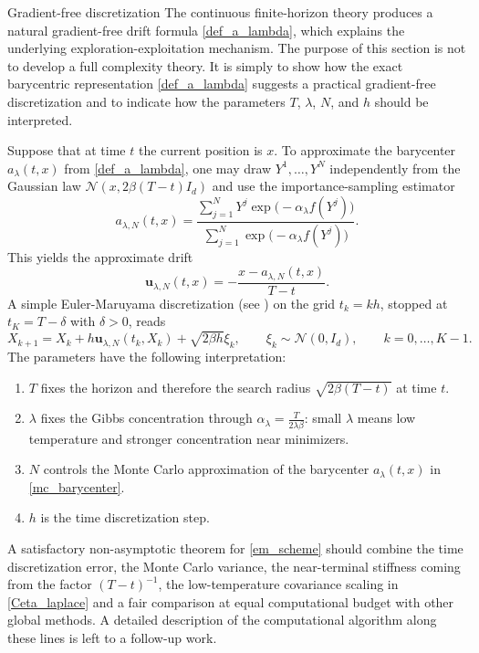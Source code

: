 \documentclass[11pt]{amsart}
\makeatletter
\renewcommand{\section}{\@startsection{section}{1}%
 \z@{.7\linespacing\@plus\linespacing}{.5\linespacing}%
 {\normalfont\large\bfseries\centering}} %
\numberwithin{equation}{section}
\numberwithin{figure}{section}
\theoremstyle{definition}\newtheorem{remark}[theorem]{Remark}%
\makeatother
\begin{document}
\section{Gradient-free discretization}\label{numerics_sec}
The continuous finite-horizon theory produces a natural gradient-free drift formula \eqref{def_a_lambda}, which explains the underlying exploration-exploitation mechanism. The purpose of this section is not to develop a full complexity theory. It is simply to show how the exact barycentric representation \eqref{def_a_lambda} suggests a practical gradient-free discretization and to indicate how the parameters $T$, $\lambda$, $N$, and $h$ should be interpreted.

Suppose that at time $t$ the current position is $x$. To approximate the barycenter $a_\lambda(t,x)$ from \eqref{def_a_lambda}, one may draw $Y^1,\dots,Y^N$ independently from the Gaussian law $\mathcal N(x,2\beta(T-t)I_d)$ and use the importance-sampling estimator
\begin{equation}\label{mc_barycenter}
a_{\lambda,N}(t,x) = \frac{\sum_{j=1}^N Y^j \exp \big( - \alpha_\lambda f(Y^j) \big)}{\sum_{j=1}^N \exp \big( - \alpha_\lambda f(Y^j) \big)}.
\end{equation}
This yields the approximate drift
\begin{equation}\label{approx_drift}
\mathbf u_{\lambda,N}(t,x) = - \frac{x - a_{\lambda,N}(t,x)}{T-t}.
\end{equation}
A simple Euler-Maruyama discretization (see \cite{KloedenPlaten92}) on the grid $t_k = kh$, stopped at $t_K = T - \delta$ with $\delta > 0$, reads
\begin{equation}\label{em_scheme}
X_{k+1} = X_k + h\mathbf u_{\lambda,N}(t_k,X_k) + \sqrt{2\beta h}\xi_k,
\qquad
\xi_k \sim \mathcal N(0,I_d),
\qquad
k = 0,\dots,K-1.
\end{equation}
The parameters have the following interpretation:
\begin{enumerate}[label=\roman*)]
\item $T$ fixes the horizon and therefore the search radius $\sqrt{2\beta(T-t)}$ at time $t$.
\item $\lambda$ fixes the Gibbs concentration through $\alpha_\lambda = \frac{T}{2\lambda\beta}$: small $\lambda$ means low temperature and stronger concentration near minimizers.
\item $N$ controls the Monte Carlo approximation of the barycenter $a_\lambda(t,x)$ in \eqref{mc_barycenter}.
\item $h$ is the time discretization step.
\end{enumerate}
A satisfactory non-asymptotic theorem for \eqref{em_scheme} should combine the time discretization error, the Monte Carlo variance, the near-terminal stiffness coming from the factor $(T-t)^{-1}$, the low-temperature covariance scaling in \eqref{Ceta_laplace} and a fair comparison at equal computational budget with other global methods. A detailed description of the computational algorithm along these lines is left to a follow-up work. 
\end{document}
